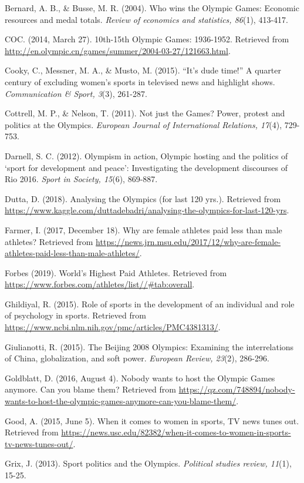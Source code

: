\documentclass[
]{article}
\begin{document}
Bernard, A. B., \& Busse, M. R. (2004). Who wins the Olympic Games: Economic resources and medal totals. \emph{Review of economics and statistics, 86}(1), 413-417.

COC. (2014, March 27). 10th-15th Olympic Games: 1936-1952. Retrieved from \url{http://en.olympic.cn/games/summer/2004-03-27/121663.html}.

Cooky, C., Messner, M. A., \& Musto, M. (2015). ``It's dude time!'' A quarter century of excluding women's sports in televised news and highlight shows. \emph{Communication \& Sport, 3}(3), 261-287.

Cottrell, M. P., \& Nelson, T. (2011). Not just the Games? Power, protest and politics at the Olympics. \emph{European Journal of International Relations, 17}(4), 729-753.

Darnell, S. C. (2012). Olympism in action, Olympic hosting and the politics of `sport for development and peace': Investigating the development discourses of Rio 2016. \emph{Sport in Society, 15}(6), 869-887.

Dutta, D. (2018). Analysing the Olympics (for last 120 yrs.). Retrieved from \url{https://www.kaggle.com/duttadebadri/analysing-the-olympics-for-last-120-yrs}.

Farmer, I. (2017, December 18). Why are female athletes paid less than male athletes? Retrieved from \url{https://news.jrn.msu.edu/2017/12/why-are-female-athletes-paid-less-than-male-athletes/}.

Forbes (2019). World's Highest Paid Athletes. Retrieved from \url{https://www.forbes.com/athletes/list//\#tab:overall}.

Ghildiyal, R. (2015). Role of sports in the development of an individual and role of psychology in sports. Retrieved from \url{https://www.ncbi.nlm.nih.gov/pmc/articles/PMC4381313/}.

Giulianotti, R. (2015). The Beijing 2008 Olympics: Examining the interrelations of China, globalization, and soft power. \emph{European Review, 23}(2), 286-296.

Goldblatt, D. (2016, August 4). Nobody wants to host the Olympic Games anymore. Can you blame them? Retrieved from \url{https://qz.com/748894/nobody-wants-to-host-the-olympic-games-anymore-can-you-blame-them/}.

Good, A. (2015, June 5). When it comes to women in sports, TV news tunes out. Retrieved from \url{https://news.usc.edu/82382/when-it-comes-to-women-in-sports-tv-news-tunes-out/}.

Grix, J. (2013). Sport politics and the Olympics. \emph{Political studies review, 11}(1), 15-25.
\end{document}
